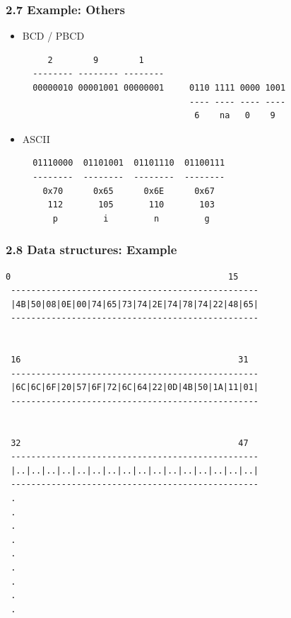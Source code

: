 \begin{frame}[fragile]
  \frametitle{2.7 Example: Others}
  \begin{itemize}
    \item[] BCD / PBCD
  \begin{verbatim}
     2        9        1    
  -------- -------- --------
  00000010 00001001 00000001     0110 1111 0000 1001
                                 ---- ---- ---- ----
                                  6    na   0    9
  \end{verbatim}
    \item[] ASCII
  \begin{verbatim}
  01110000  01101001  01101110  01100111
  --------  --------  --------  --------
    0x70      0x65      0x6E      0x67
     112       105       110       103
      p         i         n         g
  \end{verbatim}
  \end{itemize}
\end{frame}


\begin{frame}[fragile]
  \frametitle{2.8 Data structures: Example}
\begin{lstlisting}[basicstyle=\tiny]
  0                                           15
 -------------------------------------------------
 |4B|50|08|0E|00|74|65|73|74|2E|74|78|74|22|48|65|
 -------------------------------------------------
 

 16                                           31
 -------------------------------------------------
 |6C|6C|6F|20|57|6F|72|6C|64|22|0D|4B|50|1A|11|01|
 -------------------------------------------------
  

 32                                           47
 -------------------------------------------------
 |..|..|..|..|..|..|..|..|..|..|..|..|..|..|..|..|
 -------------------------------------------------
 .
 .
 .
 .
 .
 .
 .
 .
 .
\end{lstlisting}
\end{frame}


